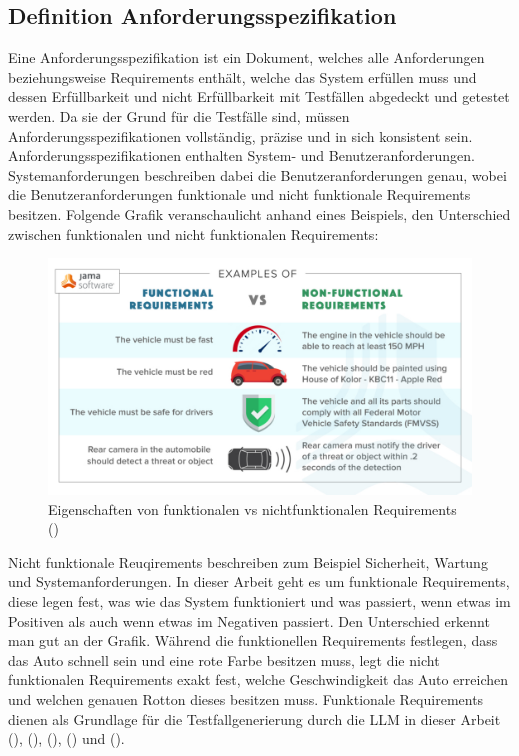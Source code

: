 \documentclass[12pt,toc=bib,toc=listof]{scrreprt}
\begin{document}
\subsection{Definition Anforderungsspezifikation} %
\label{sec:definitionAnforderungsspezifikation}
Eine Anforderungsspezifikation ist ein Dokument, welches alle Anforderungen beziehungsweise Requirements enthält, welche das System erfüllen muss und dessen Erfüllbarkeit und nicht Erfüllbarkeit mit Testfällen abgedeckt und getestet werden. Da sie der Grund für die Testfälle sind, müssen Anforderungsspezifikationen vollständig, präzise und in sich konsistent sein. Anforderungsspezifikationen enthalten System- und Benutzeranforderungen. Systemanforderungen beschreiben dabei die Benutzeranforderungen genau, wobei die Benutzeranforderungen funktionale und nicht funktionale Requirements besitzen. Folgende Grafik veranschaulicht anhand eines Beispiels, den Unterschied zwischen funktionalen und nicht funktionalen Requirements:

\begin{figure}[H]
    \centering
    \includegraphics[width=0.75\linewidth]{./Bilder/Jama Software_Eigenschaften von funktionalen vs nichtfunktionalen Requirements.jpg}
    \caption{Eigenschaften von funktionalen vs nichtfunktionalen Requirements (\cite{JamaSoftware2024})}
    \label{fig:enter-label}
\end{figure}
\noindent Nicht funktionale Reuqirements beschreiben zum Beispiel Sicherheit, Wartung und Systemanforderungen. In dieser Arbeit geht es um funktionale Requirements, diese legen fest, was wie das System funktioniert und was passiert, wenn etwas im Positiven als auch wenn etwas im Negativen passiert. Den Unterschied erkennt man gut an der Grafik. Während die funktionellen Requirements festlegen, dass das Auto schnell sein und eine rote Farbe besitzen muss, legt die nicht funktionalen Requirements exakt fest, welche Geschwindigkeit das Auto erreichen und welchen genauen Rotton dieses besitzen muss. Funktionale Requirements dienen als Grundlage für die Testfallgenerierung durch die LLM in dieser Arbeit (\cite{Aysolmaz2018}), (\cite{Barmi2011}), (\cite{JamaSoftware2024}), (\cite{Mustafa2021}) und (\cite{Visure2024}).
\end{document}
